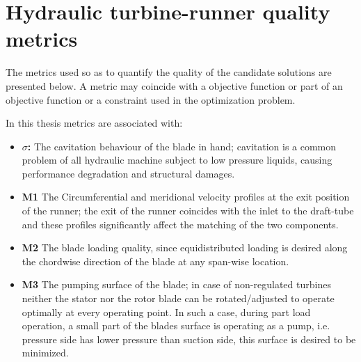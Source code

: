 







\section{Hydraulic turbine-runner quality metrics}
\label{metrics}
The metrics used so as to quantify the quality of the candidate solutions are presented below. A metric may coincide with a objective function or part of an objective function or a constraint used in the optimization problem.

In this thesis metrics are associated with:
\begin{itemize}
\item{\textbf{$\sigma$:}} The cavitation behaviour of the blade in hand; cavitation is a common problem of all hydraulic machine subject to low pressure liquids, causing performance degradation and structural damages.
\item{\textbf{M1}} The Circumferential and meridional velocity profiles at the exit position of the runner; the exit of the runner coincides with the inlet to the draft-tube and these profiles significantly affect the matching of the two components.
\item{\textbf{M2}} The blade loading quality, since equidistributed loading is desired along the chordwise direction of the blade at any span-wise location.
\item{\textbf{M3}} The pumping surface of the blade; in case of non-regulated turbines neither the stator nor the rotor blade can be rotated/adjusted to operate optimally at every operating point. In such a case, during  part load operation, a small part of the blades surface is operating as a pump, i.e. pressure side has lower pressure than suction side, this surface is desired to be minimized.
\end{itemize}


